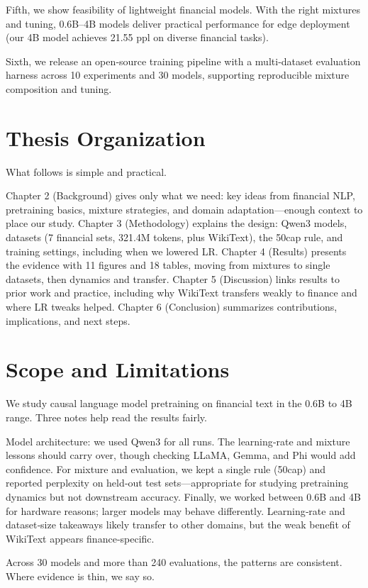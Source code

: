 Fifth, we show feasibility of lightweight financial models. With the right mixtures and tuning, 0.6B–4B models deliver practical performance for edge deployment (our 4B model achieves 21.55 ppl on diverse financial tasks).

Sixth, we release an open‑source training pipeline with a multi‑dataset evaluation harness across 10 experiments and 30 models, supporting reproducible mixture composition and tuning.

\section{Thesis Organization}

What follows is simple and practical.

Chapter 2 (Background) gives only what we need: key ideas from financial NLP, pretraining basics, mixture strategies, and domain adaptation—enough context to place our study. Chapter 3 (Methodology) explains the design: Qwen3 models, datasets (7 financial sets, 321.4M tokens, plus WikiText), the 50cap rule, and training settings, including when we lowered LR. Chapter 4 (Results) presents the evidence with 11 figures and 18 tables, moving from mixtures to single datasets, then dynamics and transfer. Chapter 5 (Discussion) links results to prior work and practice, including why WikiText transfers weakly to finance and where LR tweaks helped. Chapter 6 (Conclusion) summarizes contributions, implications, and next steps.

\section{Scope and Limitations}

We study causal language model pretraining on financial text in the 0.6B to 4B range. Three notes help read the results fairly.

Model architecture: we used Qwen3 for all runs. The learning‑rate and mixture lessons should carry over, though checking LLaMA, Gemma, and Phi would add confidence. For mixture and evaluation, we kept a single rule (50cap) and reported perplexity on held‑out test sets—appropriate for studying pretraining dynamics but not downstream accuracy. Finally, we worked between 0.6B and 4B for hardware reasons; larger models may behave differently. Learning‑rate and dataset‑size takeaways likely transfer to other domains, but the weak benefit of WikiText appears finance‑specific.

Across 30 models and more than 240 evaluations, the patterns are consistent. Where evidence is thin, we say so.
